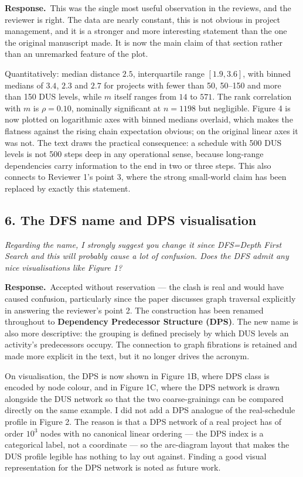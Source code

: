 \documentclass[11pt,a4paper]{article}
\newcommand{\rev}[1]{\medskip\noindent\textit{#1}\par\medskip}
\newcommand{\reply}{\noindent\textbf{Response.}\ }
\begin{document}
\reply This was the single most useful observation in the reviews, and the
reviewer is right. The data are nearly constant, this is not obvious in
project management, and it is a stronger and more interesting statement than the
one the original manuscript made. It is now the main claim of that section rather
than an unremarked feature of the plot.

Quantitatively: median distance $2.5$, interquartile range $[1.9, 3.6]$, with
binned medians of $3.4$, $2.3$ and $2.7$ for projects with fewer than 50, 50--150
and more than 150 DUS levels, while $m$ itself ranges from $14$ to $571$. The
rank correlation with $m$ is $\rho = 0.10$, nominally significant at $n = 1198$
but negligible. Figure 4 is now plotted on logarithmic axes with binned medians
overlaid, which makes the flatness against the rising chain expectation obvious;
on the original linear axes it was not. The text draws the practical
consequence: a schedule with 500 DUS levels is not 500 steps deep in any
operational sense, because long-range dependencies carry information to the end
in two or three steps. This also connects to Reviewer 1's point 3, where the
strong small-world claim has been replaced by exactly this statement.

\subsection*{6. The DFS name and DPS visualisation}

\rev{Regarding the name, I strongly suggest you change it since DFS=Depth First
Search and this will probably cause a lot of confusion. Does the DFS admit any
nice visualisations like Figure 1?}

\reply Accepted without reservation --- the clash is real and would have caused
confusion, particularly since the paper discusses graph traversal explicitly in
answering the reviewer's point 2. The construction has been renamed throughout
to \textbf{Dependency Predecessor Structure (DPS)}. The new name is also more
descriptive: the grouping is defined precisely by which DUS levels an activity's
predecessors occupy. The connection to graph fibrations is retained and made
more explicit in the text, but it no longer drives the acronym.

On visualisation, the DPS is now shown in Figure 1B, where DPS class is encoded
by node colour, and in Figure 1C, where the DPS network is drawn alongside the
DUS network so that the two coarse-grainings can be compared directly on the
same example. I did not add a DPS analogue of the real-schedule profile in
Figure 2. The reason is that a DPS network of a real project has of order
$10^3$ nodes with no canonical linear ordering --- the DPS index is a
categorical label, not a coordinate --- so the arc-diagram layout that makes the
DUS profile legible has nothing to lay out against. Finding a good visual
representation for the DPS network is noted as future work.
\end{document}
